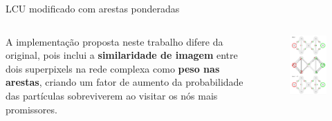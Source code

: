 \documentclass{templatebeamerufc/libs/ufc_format}
\begin{document}
\begin{frame}{LCU modificado com arestas ponderadas}
  \begin{columns}{}

    \begin{column}{0.6\textwidth}
      A implementação proposta neste trabalho difere da original,
      pois inclui a \textbf{similaridade de imagem} entre dois superpixels na rede
      complexa como \textbf{peso nas arestas}, criando um fator de aumento da
      probabilidade das partículas sobreviverem ao visitar os nós mais promissores.
    \end{column}

    \begin{column}{0.5\textwidth}
      \begin{figure}[h!]\label{fig:lcu-classification-split2}
        \centering
        \includegraphics[scale=0.21]{figuras/lcu-iteration}
      \end{figure}
    \end{column}
  \end{columns}

\end{frame}
\end{document}
